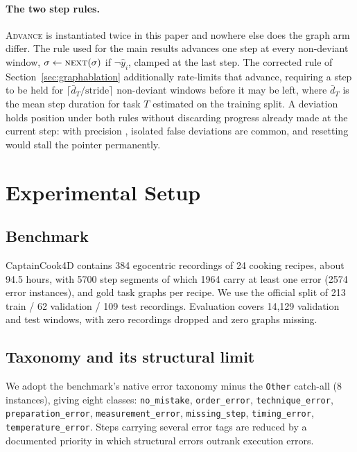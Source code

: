\documentclass[10pt,twocolumn]{article}
\begin{document}
\paragraph{The two step rules.} \textsc{Advance} is instantiated twice in this
paper and nowhere else does the graph arm differ. The rule used for the main
results advances one step at every non-deviant window,
$\sigma \gets \textsc{next}(\sigma)$ if $\neg\hat y_i$, clamped at the last
step. The corrected rule of Section~\ref{sec:graphablation} additionally
rate-limits that advance, requiring a step to be held for
$\lceil \bar d_T/\text{stride}\rceil$ non-deviant windows before it may be left,
where $\bar d_T$ is the mean step duration for task $T$ estimated on the
training split. A deviation holds position under both rules without discarding
progress already made at the current step: with precision \resP{}, isolated
false deviations are common, and resetting would stall the pointer permanently.

\section{Experimental Setup}
\label{sec:setup}

\subsection{Benchmark}
CaptainCook4D \citep{peddi2024captaincook4d} contains 384 egocentric recordings
of 24 cooking recipes, about 94.5 hours, with 5700 step segments of which 1964
carry at least one error (2574 error instances), and gold task graphs per recipe.
We use the official split of 213 train / 62 validation / 109 test recordings.
Evaluation covers 14{,}129 validation and \resWindows{} test windows, with zero
recordings dropped and zero graphs missing.

\subsection{Taxonomy and its structural limit}
We adopt the benchmark's native error taxonomy minus the \texttt{Other} catch-all
(8 instances), giving eight classes: \texttt{no\_mistake}, \texttt{order\_error},
\texttt{technique\_error}, \texttt{preparation\_error},
\texttt{measurement\_error}, \texttt{missing\_step}, \texttt{timing\_error},
\texttt{temperature\_error}. Steps carrying several error tags are reduced by a
documented priority in which structural errors outrank execution errors.
\end{document}
